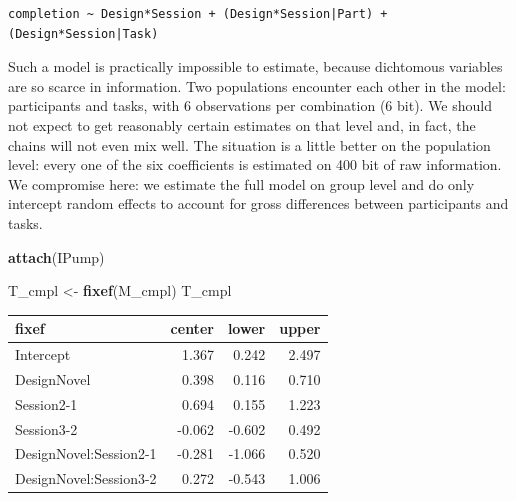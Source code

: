 \documentclass[]{svmono}
\newenvironment{Shaded}{\begin{snugshade}}{\end{snugshade}}
\newcommand{\KeywordTok}[1]{\textcolor[rgb]{0.13,0.29,0.53}{\textbf{#1}}}
\newcommand{\DataTypeTok}[1]{\textcolor[rgb]{0.13,0.29,0.53}{#1}}
\newcommand{\DecValTok}[1]{\textcolor[rgb]{0.00,0.00,0.81}{#1}}
\newcommand{\StringTok}[1]{\textcolor[rgb]{0.31,0.60,0.02}{#1}}
\newcommand{\OperatorTok}[1]{\textcolor[rgb]{0.81,0.36,0.00}{\textbf{#1}}}
\newcommand{\NormalTok}[1]{#1}
\begin{document}
\begin{verbatim}
completion ~ Design*Session + (Design*Session|Part) + (Design*Session|Task)
\end{verbatim}

Such a model is practically impossible to estimate, because dichtomous
variables are so scarce in information. Two populations encounter each
other in the model: participants and tasks, with 6 observations per
combination (6 bit). We should not expect to get reasonably certain
estimates on that level and, in fact, the chains will not even mix well.
The situation is a little better on the population level: every one of
the six coefficients is estimated on 400 bit of raw information. We
compromise here: we estimate the full model on group level and do only
intercept random effects to account for gross differences between
participants and tasks.

\begin{Shaded}
\begin{Highlighting}[]
\KeywordTok{attach}\NormalTok{(IPump)}
\end{Highlighting}
\end{Shaded}

\begin{Shaded}
\end{Shaded}

\begin{Shaded}
\begin{Highlighting}[]
\NormalTok{T_cmpl <-}\StringTok{ }
\StringTok{  }\KeywordTok{fixef}\NormalTok{(M_cmpl)}
\NormalTok{T_cmpl}
\end{Highlighting}
\end{Shaded}

\begin{longtable}[]{@{}lrrr@{}}
\toprule
fixef & center & lower & upper\tabularnewline
\midrule
\endhead
Intercept & 1.367 & 0.242 & 2.497\tabularnewline
DesignNovel & 0.398 & 0.116 & 0.710\tabularnewline
Session2-1 & 0.694 & 0.155 & 1.223\tabularnewline
Session3-2 & -0.062 & -0.602 & 0.492\tabularnewline
DesignNovel:Session2-1 & -0.281 & -1.066 & 0.520\tabularnewline
DesignNovel:Session3-2 & 0.272 & -0.543 & 1.006\tabularnewline
\bottomrule
\end{longtable}
\end{document}
